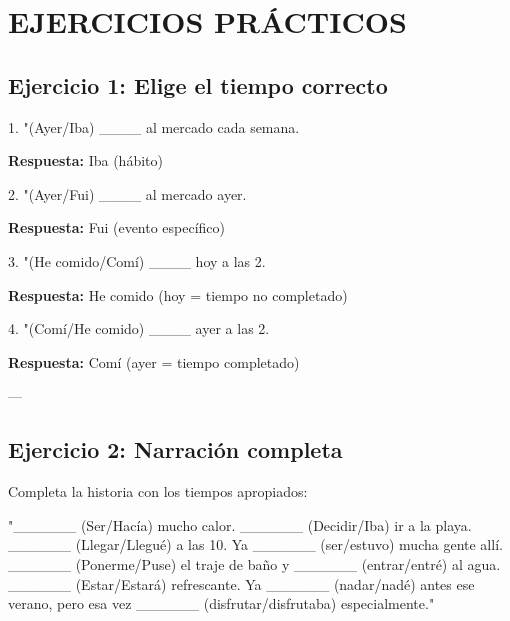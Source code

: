 \documentclass[a4paper,11pt]{article}
\begin{document}
\section{EJERCICIOS PRÁCTICOS}

\vspace{0.2cm}

\subsection{Ejercicio 1: Elige el tiempo correcto}

\vspace{0.2cm}

1. "(Ayer/Iba) ____ al mercado cada semana.

\textbf{Respuesta:} Iba (hábito)

\vspace{0.2cm}

2. "(Ayer/Fui) ____ al mercado ayer.

\textbf{Respuesta:} Fui (evento específico)

\vspace{0.2cm}

3. "(He comido/Comí) ____ hoy a las 2.

\textbf{Respuesta:} He comido (hoy = tiempo no completado)

\vspace{0.2cm}

4. "(Comí/He comido) ____ ayer a las 2.

\textbf{Respuesta:} Comí (ayer = tiempo completado)

\vspace{0.2cm}

---

\vspace{0.2cm}

\subsection{Ejercicio 2: Narración completa}

\vspace{0.2cm}

Completa la historia con los tiempos apropiados:

\vspace{0.2cm}

"______ (Ser/Hacía) mucho calor. ______ (Decidir/Iba) ir a la playa. ______ (Llegar/Llegué) a las 10. Ya ______ (ser/estuvo) mucha gente allí. ______ (Ponerme/Puse) el traje de baño y ______ (entrar/entré) al agua. ______ (Estar/Estará) refrescante. Ya ______ (nadar/nadé) antes ese verano, pero esa vez ______ (disfrutar/disfrutaba) especialmente."
\end{document}
